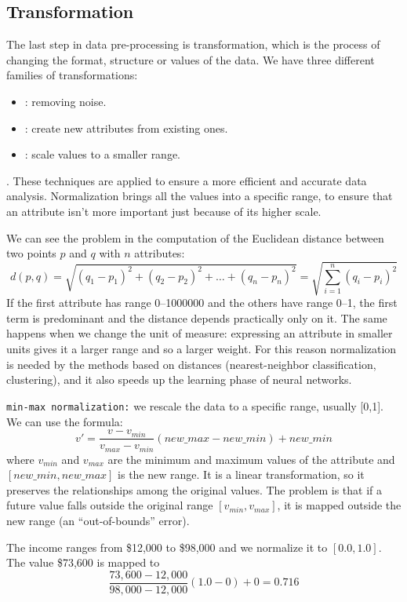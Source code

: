 \subsection{Transformation}

The last step in data pre-processing is transformation, which is the process of changing the format, structure or values of the data. We have three different families of transformations:
\begin{itemize}
    \item {}: removing noise.
    \item {}: create new attributes from existing ones.
    \item {}: scale values to a smaller range.
\end{itemize}

. These techniques are applied to ensure a more efficient and accurate data analysis. Normalization brings all the values into a specific range, to ensure that an attribute isn't more important just because of its higher scale.

We can see the problem in the computation of the Euclidean distance between two points $p$ and $q$ with $n$ attributes:
\[
    d(p,q) = \sqrt{(q_1-p_1)^2+(q_2-p_2)^2+\dots+(q_n-p_n)^2} = \sqrt{\sum_{i=1}^{n}(q_i-p_i)^2}
\]
If the first attribute has range 0--1000000 and the others have range 0--1, the first term is predominant and the distance depends practically only on it. The same happens when we change the unit of measure: expressing an attribute in smaller units gives it a larger range and so a larger weight. For this reason normalization is needed by the methods based on distances (nearest-neighbor classification, clustering), and it also speeds up the learning phase of neural networks.

\texttt{min-max normalization:} we rescale the data to a specific range, usually [0,1]. We can use the formula:
\[
    v' = \frac{v-v_{min}}{v_{max}-v_{min}}(new\_max - new\_min)+new\_min
\]
where $v_{min}$ and $v_{max}$ are the minimum and maximum values of the attribute and $[new\_min,\allowbreak new\_max]$ is the new range. It is a linear transformation, so it preserves the relationships among the original values. The problem is that if a future value falls outside the original range $[v_{min}, v_{max}]$, it is mapped outside the new range (an ``out-of-bounds'' error).

\begin{example}
The income ranges from \$12,000 to \$98,000 and we normalize it to $[0.0, 1.0]$. The value \$73,600 is mapped to
\[
    \frac{73{,}600-12{,}000}{98{,}000-12{,}000}(1.0-0)+0 = 0.716
\]
\end{example}


